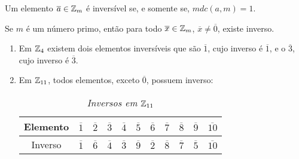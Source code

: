 \begin{proposicao}
    Um elemento $\overline{a} \in \mathbb{Z}_m$ é inversível se, e somente se, $mdc(a,m)=1$.
\end{proposicao}

\begin{corolario}
    Se $m$ é um número primo, então para todo $\overline{x} \in \mathbb{Z}_m$, $\overline{x} \ne \overline{0}$, existe inverso.
\end{corolario}

\begin{exemplos}
    \begin{enumerate}[label={\arabic*})]
        \item Em $\mathbb{Z}_4$ existem dois elementos inversíveis que são $\overline{1}$, cujo inverso é $\overline{1}$, e o $\overline{3}$, cujo inverso é $\overline{3}$.
        \item Em $\mathbb{Z}_{11}$, todos elementos, exceto $\overline{0}$, possuem inverso:

        \begin{table}[h]
               \centering
               \setlength{\arrayrulewidth}{0,5\arrayrulewidth}
               \caption{\it Inversos em $\mathbb{Z}_{11}$}
           \begin{tabular}{|c|c|c|c|c|c|c|c|c|c|c|}
                \hline
                  Elemento & $\overline{1}$ & $\overline{2}$ & $\overline{3}$ & $\overline{4}$ & $\overline{5}$ & $\overline{6}$ & $\overline{7}$ & $\overline{8}$ & $\overline{9}$ & $\overline{10}$\T \\
                  \hline
                  Inverso & $\overline{1}$ & $\overline{6}$ & $\overline{4}$ & $\overline{3}$ & $\overline{9}$ & $\overline{2}$ & $\overline{8}$ & $\overline{7}$ & $\overline{5}$ & $\overline{10}$\T \\
                  \hline
           \end{tabular}
        \end{table}
    \end{enumerate}
\end{exemplos}




